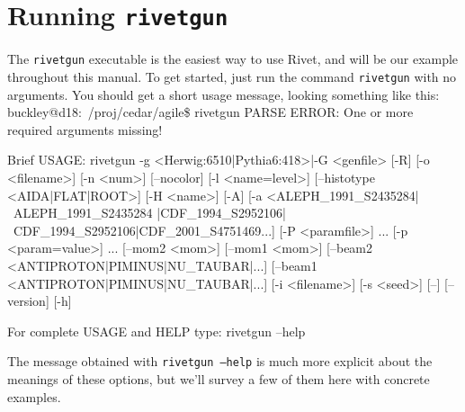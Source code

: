 \documentclass{JHEP3}
\newenvironment{snippet}{\Verbatim}{\endVerbatim}
\newcommand{\kbd}[1]{\texttt{#1}\xspace}
\newcommand{\inp}[1]{\textsf{\textdollar}\hspace{1mm}\texttt{#1}\xspace}
\begin{document}
\section{Running \kbd{rivetgun}}
\label{sec:rivetgun}
The \kbd{rivetgun} executable is the easiest way to use Rivet, and will be our
example throughout this manual. To get started, just run the command
\inp{rivetgun} with no arguments. You should get a short usage message, looking
something like this:
%
\begin{snippet}
buckley@d18:~/proj/cedar/agile\$ rivetgun
PARSE ERROR:  
             One or more required arguments missing!

Brief USAGE: 
   rivetgun  {-g <Herwig:6510|Pythia6:418>|-G <genfile>} [-R] 
             [-o <filename>] [-n <num>] [--nocolor] [-l <name=level>] 
             [--histotype <AIDA|FLAT|ROOT>] [-H <name>]
             [-A] [-a <ALEPH_1991_S2435284|~ALEPH_1991_S2435284
             |CDF_1994_S2952106|~CDF_1994_S2952106|CDF_2001_S4751469...]
             [-P <paramfile>] ...  [-p <param=value>] ...  [--mom2 <mom>]
             [--mom1 <mom>] [--beam2 <ANTIPROTON|PIMINUS|NU_TAUBAR|...]
             [--beam1 <ANTIPROTON|PIMINUS|NU_TAUBAR|...]
             [-i <filename>] [-s <seed>] [--] [--version] [-h]

For complete USAGE and HELP type: 
   rivetgun --help
\end{snippet}

The message obtained with \kbd{rivetgun --help} is much more explicit about the
meanings of these options, but we'll survey a few of them here with concrete examples.
\end{document}
